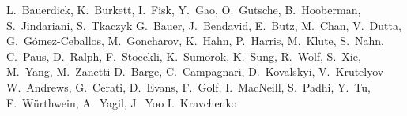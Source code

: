\begin{Authlist}
%
L.~Bauerdick, K.~Burkett, I.~Fisk, Y.~Gao, O.~Gutsche, B.~Hooberman, S.~Jindariani, S.~Tkaczyk
%
G.~Bauer, J.~Bendavid, E.~Butz, M.~Chan, V.~Dutta, G.~G\'omez-Ceballos, M.~Goncharov, K.~Hahn, P.~Harris, M.~Klute, S.~Nahn, C.~Paus, D.~Ralph, F.~Stoeckli, K.~Sumorok, K.~Sung, R.~Wolf, S.~Xie, M.~Yang, M.~Zanetti
%
D.~Barge, C.~Campagnari, D.~Kovalskyi, V.~Krutelyov
%
W.~Andrews, G.~Cerati, D.~Evans, F.~Golf, I.~MacNeill, S.~Padhi, Y.~Tu, F.~W\"urthwein, A.~Yagil, J.~Yoo
%
I.~Kravchenko

\end{Authlist}
